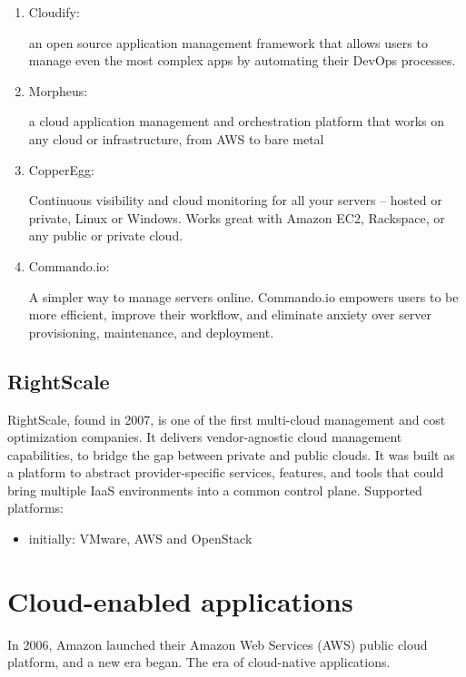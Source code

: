 \begin{enumerate}
   \item Cloudify:
   
    an open source application management framework that allows users to manage even the most complex apps by automating their DevOps processes.
    
    
    \item Morpheus: 
    
    a cloud application management and orchestration platform that works on any cloud or infrastructure, from AWS to bare metal
    
  \item CopperEgg:
  
  Continuous visibility and cloud monitoring for all your servers – hosted or private, Linux or Windows. Works great with Amazon EC2, Rackspace, or any public or private cloud.
  
  \item Commando.io:
  
  A simpler way to manage servers online. Commando.io empowers users to be more
  efficient, improve their workflow, and eliminate anxiety over server
  provisioning, maintenance, and deployment.
  
  
  
\end{enumerate}

\section{RightScale}

RightScale, found in 2007, is one of the first multi-cloud management and cost
optimization companies.
It delivers vendor-agnostic cloud management capabilities, to bridge the gap between private and public clouds.
It was built as a platform to abstract provider-specific services, features, and
tools that could bring multiple IaaS environments into a common control plane.
Supported platforms:
\begin{itemize}
  \item initially: VMware, AWS and OpenStack
\end{itemize}


\chapter{Cloud-enabled applications}
\label{chap:cloud-native-apps}

In 2006, Amazon launched their Amazon Web Services (AWS) public cloud platform,
and a new era began. The era of cloud-native applications.

